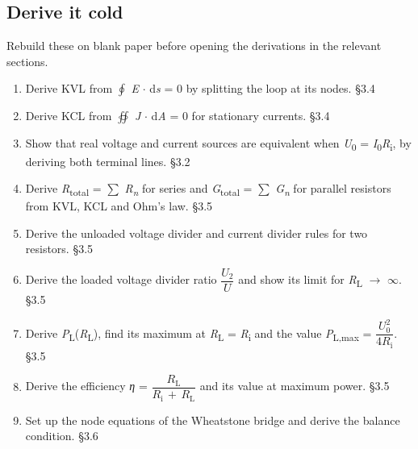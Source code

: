 \documentclass[11pt]{article}
\begin{document}
\begin{keepsection}
\section{Derive it cold}

Rebuild these on blank paper before opening the derivations in the relevant sections.

\begin{enumerate}
\item Derive KVL from $\oint $ \textit{E} \ensuremath{\cdot} d\textit{s} = 0 by splitting the loop at its nodes. \hfill{\small\color{FAUblue}§3.4}
\item Derive KCL from $\oiint $ \textit{J} \ensuremath{\cdot} d\textit{A} = 0 for stationary currents. \hfill{\small\color{FAUblue}§3.4}
\item Show that real voltage and current sources are equivalent when \textit{U}\textsubscript{0} = \textit{I}\textsubscript{0}\textit{R}\textsubscript{i}, by deriving both terminal lines. \hfill{\small\color{FAUblue}§3.2}
\item Derive \textit{R}\textsubscript{total} = \ensuremath{\textstyle\sum} \textit{R}\textsubscript{\textit{n}} for series and \textit{G}\textsubscript{total} = \ensuremath{\textstyle\sum} \textit{G}\textsubscript{\textit{n}} for parallel resistors from KVL, KCL and Ohm’s law. \hfill{\small\color{FAUblue}§3.5}
\item Derive the unloaded voltage divider and current divider rules for two resistors. \hfill{\small\color{FAUblue}§3.5}
\item Derive the loaded voltage divider ratio {\small\ensuremath{\dfrac{{U}_{2}}{{U}}}} and show its limit for \textit{R}\textsubscript{L} \ensuremath{\to} \ensuremath{\infty}. \hfill{\small\color{FAUblue}§3.5}
\item Derive \textit{P}\textsubscript{L}(\textit{R}\textsubscript{L}), find its maximum at \textit{R}\textsubscript{L} = \textit{R}\textsubscript{i} and the value \textit{P}\textsubscript{L,max} = {\small\ensuremath{\dfrac{{U}_{0}^{2}}{4{R}_{\mathrm{i}}}}}. \hfill{\small\color{FAUblue}§3.5}
\item Derive the efficiency \textit{η} = {\small\ensuremath{\dfrac{{R}_{\mathrm{L}}}{{R}_{\mathrm{i}}\, +\, {R}_{\mathrm{L}}}}} and its value at maximum power. \hfill{\small\color{FAUblue}§3.5}
\item Set up the node equations of the Wheatstone bridge and derive the balance condition. \hfill{\small\color{FAUblue}§3.6}
\end{enumerate}
\end{keepsection}
\end{document}
